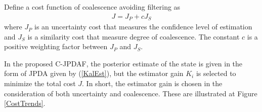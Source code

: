 \documentclass[letterpaper, 10pt, conference]{ieeeconf}
\begin{document}
Define a cost function of coalescence avoiding filtering as
\begin{align}
J=J_P+cJ_S
\end{align}
where $J_P$ is an uncertainty cost that measures the confidence level of estimation and $J_S$ is a similarity cost that measure degree of coalescence. The constant $c$ is a positive weighting factor between $J_P$ and $J_S$. 

In the proposed C-JPDAF, the posterior estimate of the state is given in the form of JPDA given by (\ref{KalEst}), but the estimator gain $K_i$ is selected to minimize the total cost $J$. In short, the estimator gain is chosen in the consideration of both uncertainty and coalescence. These are illustrated at Figure \ref{CostTrends}.





\end{document}

